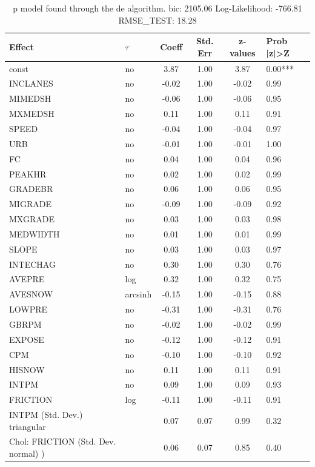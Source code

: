 \begin{table}
	\caption{p model found through the de algorithm. bic: 2105.06 Log-Likelihood: -766.81 RMSE_TEST: 18.28}
	\begin{center}
		\begin{tabular}{|l|l|c|c|c|l|}
			\hline
			Effect & $\tau$ & Coeff & Std. Err & z-values & Prob |z|>Z \\
			\hline
			const & no & 3.87 & 1.00 & 3.87 & 0.00*** \\
			\hline
			INCLANES & no & -0.02 & 1.00 & -0.02 & 0.99 \\
			\hline
			MIMEDSH & no & -0.06 & 1.00 & -0.06 & 0.95 \\
			\hline
			MXMEDSH & no & 0.11 & 1.00 & 0.11 & 0.91 \\
			\hline
			SPEED & no & -0.04 & 1.00 & -0.04 & 0.97 \\
			\hline
			URB & no & -0.01 & 1.00 & -0.01 & 1.00 \\
			\hline
			FC & no & 0.04 & 1.00 & 0.04 & 0.96 \\
			\hline
			PEAKHR & no & 0.02 & 1.00 & 0.02 & 0.99 \\
			\hline
			GRADEBR & no & 0.06 & 1.00 & 0.06 & 0.95 \\
			\hline
			MIGRADE & no & -0.09 & 1.00 & -0.09 & 0.92 \\
			\hline
			MXGRADE & no & 0.03 & 1.00 & 0.03 & 0.98 \\
			\hline
			MEDWIDTH & no & 0.01 & 1.00 & 0.01 & 0.99 \\
			\hline
			SLOPE & no & 0.03 & 1.00 & 0.03 & 0.97 \\
			\hline
			INTECHAG & no & 0.30 & 1.00 & 0.30 & 0.76 \\
			\hline
			AVEPRE & log & 0.32 & 1.00 & 0.32 & 0.75 \\
			\hline
			AVESNOW & arcsinh & -0.15 & 1.00 & -0.15 & 0.88 \\
			\hline
			LOWPRE & no & -0.31 & 1.00 & -0.31 & 0.76 \\
			\hline
			GBRPM & no & -0.02 & 1.00 & -0.02 & 0.99 \\
			\hline
			EXPOSE & no & -0.12 & 1.00 & -0.12 & 0.91 \\
			\hline
			CPM & no & -0.10 & 1.00 & -0.10 & 0.92 \\
			\hline
			HISNOW & no & 0.11 & 1.00 & 0.11 & 0.91 \\
			\hline
			INTPM & no & 0.09 & 1.00 & 0.09 & 0.93 \\
			\hline
			FRICTION & log & -0.11 & 1.00 & -0.11 & 0.91 \\
			\hline
			INTPM (Std. Dev.) triangular &  & 0.07 & 0.07 & 0.99 & 0.32 \\
			\hline
			 Chol: FRICTION (Std. Dev. normal) ) &  & 0.06 & 0.07 & 0.85 & 0.40 \\
			\hline
		\end{tabular}
	\end{center}
\end{table}